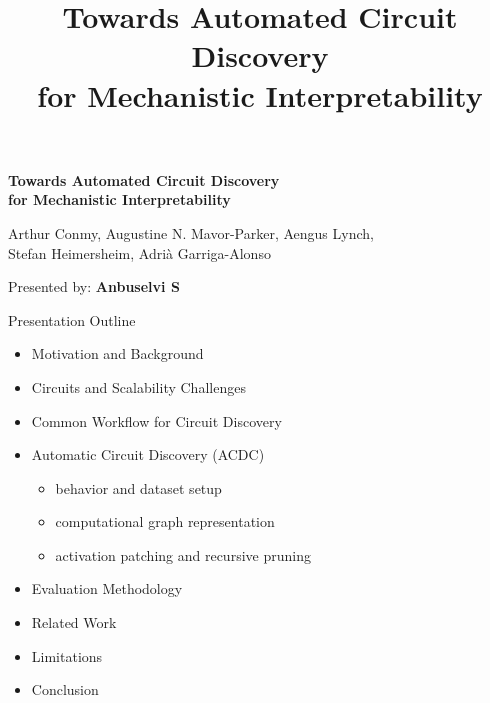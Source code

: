 \documentclass{beamer}
\title[Towards Automated Circuit Discovery]{Towards Automated Circuit Discovery\\for Mechanistic Interpretability}
\date{}
\begin{document}
	
	\begin{frame}
		\centering
		{\Large\bfseries Towards Automated Circuit Discovery\\[4pt]
			for Mechanistic Interpretability}
		
		\vspace{20pt}
		
		{\small
			Arthur Conmy, Augustine N. Mavor-Parker, Aengus Lynch,\\
			Stefan Heimersheim, Adri\`a Garriga-Alonso}
		
		\vspace{8pt}
		
		\vfill
		
		{\small
			Presented by: \textbf{Anbuselvi S}}
	\end{frame}
	
	\begin{frame}{Presentation Outline}
		\begin{itemize}
			\setstretch{1.6}
			\item Motivation and Background
			\item Circuits and Scalability Challenges
			\item Common Workflow for Circuit Discovery
			\item Automatic Circuit Discovery (ACDC)
			\begin{itemize}
				\item behavior and dataset setup
				\item computational graph representation
				\item activation patching and recursive pruning
			\end{itemize}
			\item Evaluation Methodology
			\item Related Work
			\item Limitations
			\item Conclusion
		\end{itemize}
	\end{frame}
	
\end{document}
